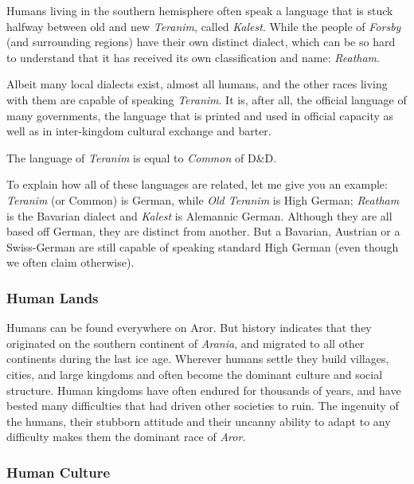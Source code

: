 Humans living in the southern hemisphere often speak a language that is
stuck halfway between old and new \emph{Teranim}, called \emph{Kalest}. While
the people of \emph{Forsby} (and surrounding regions) have their own distinct
dialect, which can be so hard to understand that it has received its own
classification and name: \emph{Reatham}.

Albeit many local dialects exist, almost all humans, and the other races
living with them are capable of speaking \emph{Teranim}. It is, after all,
the official language of many governments, the language that is printed and
used in official capacity as well as in inter-kingdom cultural exchange and
barter.

\begin{35e}
The language of \emph{Teranim} is equal to \emph{Common} of D\&D.
\end{35e}

\begin{note}
To explain how all of these languages are related, let me give you an example:
\emph{Teranim} (or Common) is German, while \emph{Old Teranim} is High German;
\emph{Reatham} is the Bavarian dialect and \emph{Kalest} is Alemannic German.
Although they are all based off German, they are distinct from another. But a
Bavarian, Austrian or a Swiss-German are still capable of speaking standard
High German (even though we often claim otherwise).
\end{note}

\subsubsection*{Human Lands}

Humans can be found everywhere on Aror. But history indicates that they
originated on the southern continent of \emph{Arania}, and migrated to all
other continents during the last ice age. Wherever humans settle they build
villages, cities, and large kingdoms and often become the dominant culture and
social structure. Human kingdoms have often endured for thousands of years,
and have bested many difficulties that had driven other societies to ruin.
The ingenuity of the humans, their stubborn attitude and their uncanny ability
to adapt to any difficulty makes them the dominant race of \emph{Aror}.

\subsubsection*{Human Culture}


